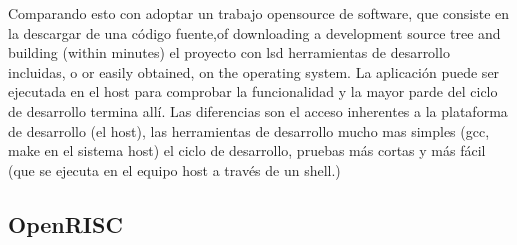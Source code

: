 Comparando esto con adoptar un trabajo opensource de software, que consiste en la descargar de una código fuente,of downloading a development source tree and building (within minutes) el proyecto con lsd herramientas de desarrollo incluidas, o  
or easily obtained, on the operating system. La aplicación puede ser ejecutada en el  host para comprobar la funcionalidad y la mayor parde del ciclo de desarrollo termina allí. Las diferencias son el acceso inherentes a la plataforma de desarrollo (el host), las herramientas de desarrollo mucho mas simples (gcc, make en el sistema host) el ciclo de desarrollo, pruebas más cortas y más fácil (que se ejecuta en el equipo host a través de un shell.)

		\subsection{OpenRISC}




\begin{figure}[h!]
 \begin{center}
  \label{fig:esquema}
 \end{center}
\end{figure}




